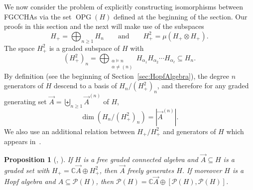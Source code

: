 \documentclass[11pt]{amsart}
\newtheorem{proposition}[theorem]{Proposition}
\theoremstyle{definition}
\numberwithin{equation}{section}
\def\CC{{\mathbb C}}
\newcommand{\FGCCHAs}{\textsf{FGCCHA}s\xspace}
\newcommand{\OPG}{\operatorname{OPG}}
\begin{document}
We now consider the problem of explicitly constructing isomorphisms between \FGCCHAs via the set $\OPG(H)$ defined at the beginning of the section.  Our proofs in this section and the next will make use of the subspaces
\[
H_{+} = \bigoplus_{n \geq 1} H_n
\qquad\text{and}\qquad 
H^{2}_{+} = \mu(H_{+} \otimes H_{+}).
\]
The space $H^{2}_{+}$ is a graded subspace of $H$ with
\begin{equation}
\label{eq:Hplusdef}
(H^{2}_{+})_{n} = \bigoplus_{\substack{\alpha \vDash n \\ \alpha \neq (n)}}
H_{\alpha_{1}} H_{\alpha_{2}}\cdots H_{\alpha_{\ell}} \subseteq H_{n}.
\end{equation}
By definition (see the beginning of Section~\ref{sec:HopfAlgebra}), the degree $n$ generators of $H$ descend to a basis of $H_{n}/ (H^{2}_{+})_{n}$, and therefore for any graded generating set $\vec{A} = \biguplus_{n \ge 1} \vec{A}^{(n)}$ of $H$, 
\[
\dim(H_{n}/(H^{2}_{+})_{n}) = |\vec{A}^{(n)}|.
\]
We also use an additional relation between $H_{+}/H^{2}_{+}$ and generators of $H$ which appears in~\cite{F23}.

\begin{proposition}[{\cite[Proposition 2.2 and 2.4]{F23}, \cite[Theorem 7.5]{MM65}}]
\label{prop:indecomposable generators}
If $H$ is a free graded connected algebra and $\vec{A} \subseteq H$ is a graded set with $H_{+} = \CC \vec{A} \oplus H_{+}^{2}$, then $\vec{A}$ freely generates $H$.  If moreover $H$ is a Hopf algebra and $A \subseteq \mathcal{P}(H)$, then $\mathcal{P}(H) = \CC \vec{A} \oplus [\mathcal{P}(H), \mathcal{P}(H)]$.
\end{proposition}
\end{document}
